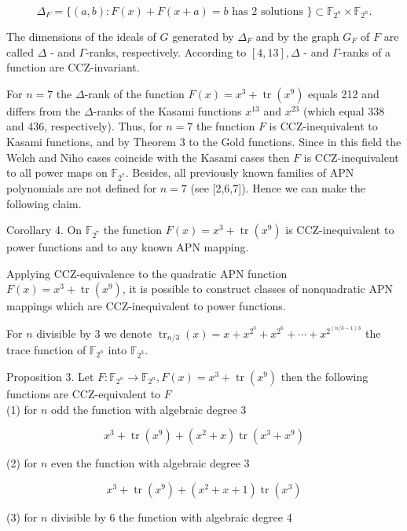 \documentclass[10pt]{article}
\begin{document}
$$
\Delta_{F}=\{(a, b): F(x)+F(x+a)=b \text { has } 2 \text { solutions }\} \subset \mathbb{F}_{2^{n}} \times \mathbb{F}_{2^{n}} .
$$

The dimensions of the ideals of $G$ generated by $\Delta_{F}$ and by the graph $G_{F}$ of $F$ are called $\Delta$ - and $\Gamma$-ranks, respectively. According to $[4,13], \Delta$ - and $\Gamma$-ranks of a function are CCZ-invariant.

For $n=7$ the $\Delta$-rank of the function $F(x)=x^{3}+\operatorname{tr}\left(x^{9}\right)$ equals 212 and differs from the $\Delta$-ranks of the Kasami functions $x^{13}$ and $x^{23}$ (which equal 338 and 436, respectively). Thus, for $n=7$ the function $F$ is CCZ-inequivalent to Kasami functions, and by Theorem 3 to the Gold functions. Since in this field the Welch and Niho cases coincide with the Kasami cases then $F$ is CCZ-inequivalent to all power maps on $\mathbb{F}_{2^{7}}$. Besides, all previously known families of APN polynomials are not defined for $n=7$ (see [2,6,7]). Hence we can make the following claim.

Corollary 4. On $\mathbb{F}_{2^{7}}$ the function $F(x)=x^{3}+\operatorname{tr}\left(x^{9}\right)$ is CCZ-inequivalent to power functions and to any known APN mapping.

Applying CCZ-equivalence to the quadratic APN function $F(x)=x^{3}+\operatorname{tr}\left(x^{9}\right)$, it is possible to construct classes of nonquadratic APN mappings which are CCZ-inequivalent to power functions.

For $n$ divisible by 3 we denote $\operatorname{tr}_{n / 3}(x)=x+x^{2^{3}}+x^{2^{6}}+\cdots+x^{2^{(n / 3-1) 3}}$ the trace function of $\mathbb{F}_{2^{n}}$ into $\mathbb{F}_{2^{3}}$.

Proposition 3. Let $F: \mathbb{F}_{2^{n}} \rightarrow \mathbb{F}_{2^{n}}, F(x)=x^{3}+\operatorname{tr}\left(x^{9}\right)$ then the following functions are CCZ-equivalent to $F$\\
(1) for $n$ odd the function with algebraic degree 3

$$
x^{3}+\operatorname{tr}\left(x^{9}\right)+\left(x^{2}+x\right) \operatorname{tr}\left(x^{3}+x^{9}\right)
$$

(2) for $n$ even the function with algebraic degree 3

$$
x^{3}+\operatorname{tr}\left(x^{9}\right)+\left(x^{2}+x+1\right) \operatorname{tr}\left(x^{3}\right)
$$

(3) for $n$ divisible by 6 the function with algebraic degree 4
\end{document}
